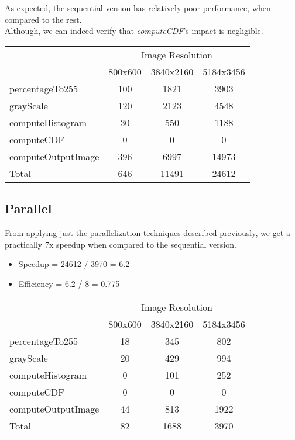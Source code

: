 \documentclass[sigconf]{acmart}
\begin{document}
As expected, the sequential version has relatively poor performance, when compared to the rest.\\
Although, we can indeed verify that \textit{computeCDF}'s impact is negligible. 

\begin{table}[H]
\begin{tabular}{|lccc|}
\hline
\multicolumn{1}{|c}{} & \multicolumn{3}{c|}{Image Resolution} \\
                      & 800x600   & 3840x2160   & 5184x3456   \\
percentageTo255       & 100       & 1821        & 3903        \\
grayScale             & 120       & 2123        & 4548        \\
computeHistogram      & 30        & 550         & 1188        \\
computeCDF            & 0         & 0           & 0           \\
computeOutputImage    & 396       & 6997        & 14973       \\
Total                 & 646       & 11491       & 24612       \\ \hline
\end{tabular}
\end{table}

\subsection{Parallel}

From applying just the parallelization techniques described previously, we get a practically 7x speedup when compared to the sequential version.\\

\begin{itemize}
    \item Speedup = 24612 / 3970 = 6.2
    \item Efficiency = 6.2 / 8 = 0.775
\end{itemize}

\begin{table}[H]
\begin{tabular}{|lccc|}
\hline
\multicolumn{1}{|c}{} & \multicolumn{3}{c|}{Image Resolution} \\
                              & 800x600   & 3840x2160   & 5184x3456   \\
percentageTo255               & 18        & 345         & 802         \\
grayScale                     & 20        & 429         & 994         \\
computeHistogram              & 0         & 101         & 252         \\
computeCDF                    & 0         & 0           & 0           \\
computeOutputImage            & 44        & 813         & 1922        \\
Total                         & 82        & 1688        & 3970        \\ \hline
\end{tabular}
\end{table}
\end{document}
